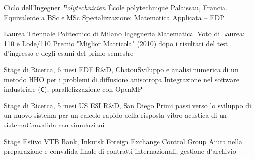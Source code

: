 \documentclass[italian]{RMcv}
\begin{document}

%
%
        {Ciclo  dell'Ingegner \textit{Polytechnicien}}%
        {École polytechnique}%
        {Palaiseau, Francia. Equivalente a BSc e MSc}%
        {Specializzazione: Matematica Applicata -- EDP}


%
%
        {Laurea Triennale}%
        {Politecnico di Milano}%
        {Ingegneria Matematica. Voto di Laurea: 110 e Lode/110}%
        {Premio "Miglior Matricola" (2010) dopo i risultati del test d'ingresso e degli esami del primo semestre}


%
%
        {Stage di Ricerca, 6 mesi}%
        {\href{https://www.politesi.polimi.it/handle/10589/133692}{EDF R\&D, Chatou}{Sviluppo e analisi numerica di un metodo HHO per i problemi di diffusione anisotropa}}%
        {Integrazione nel software industriale \cs{} (\texttt{C}); parallelizzazione con OpenMP}


%
%
        {Stage di Ricerca, 5 mesi}%
        {US ESI R\&D, San Diego}%
        {Primi passi verso lo sviluppo di un nuovo sistema per un calcolo rapido della risposta vibro-acustica di un sistema}{Convalida con simulazioni}


%
%
        {Stage Estivo}%
        {VTB Bank, Inkutsk}%
        {Foreign Exchange Control Group}%
        {Aiuto nella preparazione e convalida finale di contratti internazionali, gestione d'archivio}
\end{document}
